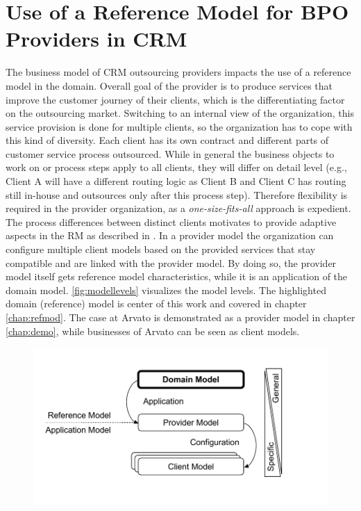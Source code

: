 \section{Use of a Reference Model for BPO Providers in CRM}
\label{sec:refmodusearvato}
The business model of CRM outsourcing providers impacts the use of a reference model in the domain. Overall goal of the provider is to produce services that improve the customer journey of their clients, which is the differentiating factor on the outsourcing market. Switching to an internal view of the organization, this service provision is done for multiple clients, so the organization has to cope with this kind of diversity. Each client has its own contract and different parts of customer service process outsourced. While in general the business objects to work on or process steps apply to all clients, they will differ on detail level (e.g., Client A will have a different routing logic as Client B and Client C has routing still in-house and outsources only after this process step). Therefore flexibility is required in the provider organization, as a \textit{one-size-fits-all} approach is expedient.
The process differences between distinct clients motivates to provide adaptive aspects in the \acrshort{RM} as described in \citep{delfmann2006adaptive}. In a provider model the organization can configure multiple client models based on the provided services that stay compatible and are linked with the provider model. By doing so, the provider model itself gets reference model characteristics, while it is an application of the domain model. \Fig \ref{fig:modellevels} visualizes the model levels. The highlighted domain (reference) model is center of this work and covered in chapter \ref{chap:refmod}. The case at Arvato is demonstrated as a provider model in chapter \ref{chap:demo}, while businesses of Arvato can be seen as client models. 

\begin{figure}[caption={Model Levels}, label={fig:modellevels}]
	{	\includegraphics[width=.8\textwidth]{figures/refmodlevels.pdf}}
\end{figure}

